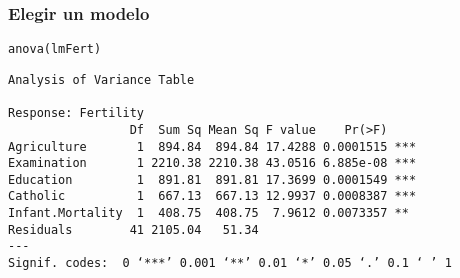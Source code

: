 \documentclass{beamer}
\begin{document}
\begin{frame}[fragile]
\frametitle{Elegir un modelo}
\label{sec-3-10}


\lstset{language=R}
\begin{lstlisting}
anova(lmFert)
\end{lstlisting}


\begin{verbatim}
Analysis of Variance Table

Response: Fertility
                 Df  Sum Sq Mean Sq F value    Pr(>F)    
Agriculture       1  894.84  894.84 17.4288 0.0001515 ***
Examination       1 2210.38 2210.38 43.0516 6.885e-08 ***
Education         1  891.81  891.81 17.3699 0.0001549 ***
Catholic          1  667.13  667.13 12.9937 0.0008387 ***
Infant.Mortality  1  408.75  408.75  7.9612 0.0073357 ** 
Residuals        41 2105.04   51.34                      
---
Signif. codes:  0 ‘***’ 0.001 ‘**’ 0.01 ‘*’ 0.05 ‘.’ 0.1 ‘ ’ 1
\end{verbatim}
\end{frame}
\end{document}
